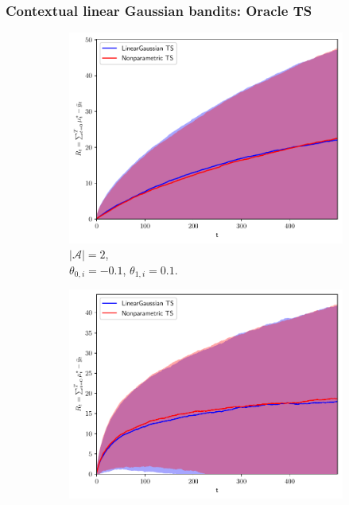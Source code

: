 \subsubsection{Contextual linear Gaussian bandits: Oracle TS}
\label{sssec:evaluation_contextual_linear_oracle}

\begin{figure}[!h]
	\centering
	\begin{subfigure}[b]{0.32\textwidth}
		\centering
		\includegraphics[width=\textwidth]{./figs/linearGaussian/cumregret_A2_-01_-01_01_01_1_1}
		\vspace*{-5ex}
		\caption{$|\mathcal{A}|=2$,\\ \hspace*{0.3cm} $\theta_{0,i}=-0.1$, $\theta_{1,i}=0.1$.}
		\label{fig:linear_gaussian_A2_01}
	\end{subfigure}
	\begin{subfigure}[b]{0.32\textwidth}
		\includegraphics[width=\textwidth]{./figs/linearGaussian/cumregret_A2_-05_-05_05_05_1_1}

\end{subfigure}
\end{figure}

